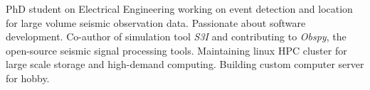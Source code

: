 

\begin{cvparagraph}

PhD student on Electrical Engineering working on event detection and location for large volume seismic observation data. Passionate about software development. Co-author of simulation tool \textit{S3I} and contributing to \textit{Obspy}, the open-source seismic signal processing tools. Maintaining linux HPC cluster for large scale storage and high-demand computing. Building custom computer server for hobby.
\end{cvparagraph}
